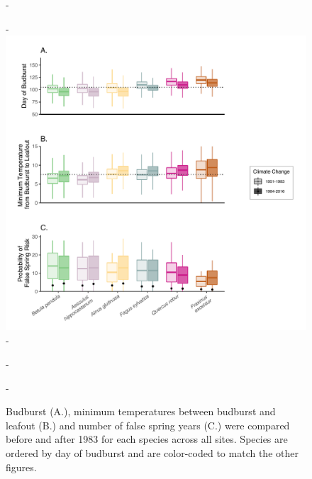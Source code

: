 \documentclass{article}\usepackage[]{graphicx}\usepackage[]{color}
\begin{document}
{\begin{figure} [H]
  -\begin{center}
  -\includegraphics[width=14cm]{..//analyses/figures/Boxplot_BBTminFS_noDots.pdf}
  -\caption{Budburst (A.), minimum temperatures between budburst and leafout (B.) and number of false spring years (C.) were compared before and after 1983 for each species across all sites. Species are ordered by day of budburst and are color-coded to match the other figures.  }\label{fig:boxfs}
  -\end{center}
  -\end{figure}}
  
\end{document}
